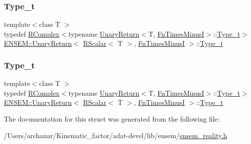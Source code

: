 \subsubsection{\texorpdfstring{Type\_t}{Type\_t}\hspace{0.1cm}{\footnotesize\ttfamily [2/3]}}
{\footnotesize\ttfamily template$<$class T $>$ \\
typedef \mbox{\hyperlink{classENSEM_1_1RComplex}{R\+Complex}}$<$typename \mbox{\hyperlink{structENSEM_1_1UnaryReturn}{Unary\+Return}}$<$T, \mbox{\hyperlink{structENSEM_1_1FnTimesMinusI}{Fn\+Times\+MinusI}}$>$\+::\mbox{\hyperlink{structENSEM_1_1UnaryReturn_3_01RScalar_3_01T_01_4_00_01FnTimesMinusI_01_4_a89dcc5ccc293077b2cb0c8328b6c883a}{Type\+\_\+t}}$>$ \mbox{\hyperlink{structENSEM_1_1UnaryReturn}{E\+N\+S\+E\+M\+::\+Unary\+Return}}$<$ \mbox{\hyperlink{classENSEM_1_1RScalar}{R\+Scalar}}$<$ T $>$, \mbox{\hyperlink{structENSEM_1_1FnTimesMinusI}{Fn\+Times\+MinusI}} $>$\+::\mbox{\hyperlink{structENSEM_1_1UnaryReturn_3_01RScalar_3_01T_01_4_00_01FnTimesMinusI_01_4_a89dcc5ccc293077b2cb0c8328b6c883a}{Type\+\_\+t}}}

\mbox{\label{structENSEM_1_1UnaryReturn_3_01RScalar_3_01T_01_4_00_01FnTimesMinusI_01_4_a89dcc5ccc293077b2cb0c8328b6c883a}} 
\subsubsection{\texorpdfstring{Type\_t}{Type\_t}\hspace{0.1cm}{\footnotesize\ttfamily [3/3]}}
{\footnotesize\ttfamily template$<$class T $>$ \\
typedef \mbox{\hyperlink{classENSEM_1_1RComplex}{R\+Complex}}$<$typename \mbox{\hyperlink{structENSEM_1_1UnaryReturn}{Unary\+Return}}$<$T, \mbox{\hyperlink{structENSEM_1_1FnTimesMinusI}{Fn\+Times\+MinusI}}$>$\+::\mbox{\hyperlink{structENSEM_1_1UnaryReturn_3_01RScalar_3_01T_01_4_00_01FnTimesMinusI_01_4_a89dcc5ccc293077b2cb0c8328b6c883a}{Type\+\_\+t}}$>$ \mbox{\hyperlink{structENSEM_1_1UnaryReturn}{E\+N\+S\+E\+M\+::\+Unary\+Return}}$<$ \mbox{\hyperlink{classENSEM_1_1RScalar}{R\+Scalar}}$<$ T $>$, \mbox{\hyperlink{structENSEM_1_1FnTimesMinusI}{Fn\+Times\+MinusI}} $>$\+::\mbox{\hyperlink{structENSEM_1_1UnaryReturn_3_01RScalar_3_01T_01_4_00_01FnTimesMinusI_01_4_a89dcc5ccc293077b2cb0c8328b6c883a}{Type\+\_\+t}}}



The documentation for this struct was generated from the following file\+:\begin{DoxyCompactItemize}
\item 
/\+Users/archanar/\+Kinematic\+\_\+factor/adat-\/devel/lib/ensem/\mbox{\hyperlink{adat-devel_2lib_2ensem_2ensem__reality_8h}{ensem\+\_\+reality.\+h}}\end{DoxyCompactItemize}
